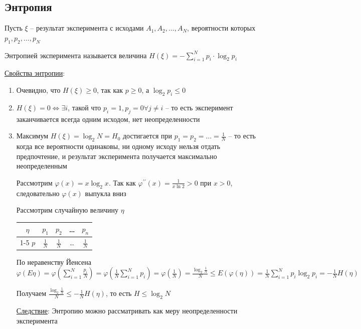 \subsection{Энтропия}

Пусть $\xi$ -- результат эксперимента с исходами $A_1, A_2, \dots, A_N$, вероятности которых $p_1, p_2, \dots, p_N$

\Def Энтропией эксперимента называется величина $H(\xi) = -\sum_{i = 1}^N p_i \cdot \log_2 p_i$

\underline{Свойства энтропии}:

\begin{enumerate}
    \item Очевидно, что $H(\xi) \geq 0$, так как $p \geq 0$, а $\log_2 p_i \leq 0$
    
    \item $H(\xi) = 0 \Longleftrightarrow \exists i$, такой что $p_i = 1, p_j = 0 \forall j \neq i$ -- то есть эксперимент заканчивается всегда одним исходом, нет неопределенности

    \item Максимум $H(\xi) = \log_2 N = H_0$ достигается при $p_1 = p_2 = \dots = \frac{1}{N}$ -- то есть когда все вероятности одинаковы, ни одному исходу нельзя отдать предпочтение, и результат эксперимента получается максимально неопределенным

    \begin{MyProof}
        Рассмотрим $\varphi(x) = x \log_2 x$. Так как $\varphi^{\prime\prime}(x) = \frac{1}{x\ln 2} > 0$ при $x > 0$, следовательно $\varphi(x)$ выпукла вниз

        Рассмотрим случайную величину $\eta$

        \begin{tabular}{c|c|c|c|c}
            $\eta$ & $p_1$ & $p_2$ & \dots & $p_n$ \\
            \cline{1-5}
            $p$   & $\frac{1}{N}$ & $\frac{1}{N}$ & \dots & $\frac{1}{N}$
        \end{tabular}

        По неравенству Йенсена $\varphi(E\eta) = \varphi(\sum_{i = 1}^N \frac{p_i}{N}) = \varphi(\frac{1}{N} \sum_{i = 1}^N p_i) = 
        \varphi(\frac{1}{N}) = \frac{\log_2 \frac{1}{N}}{N} \leq E(\varphi(\eta)) = 
        \frac{1}{N} \sum_{i = 1}^N p_i \log_2 p_i = -\frac{1}{N} H(\eta)$

        Получаем $\frac{\log_2 \frac{1}{N}}{N} \leq -\frac{1}{N} H(\eta)$, то есть $H \leq \log_2 N$
    \end{MyProof}

    \underline{Следствие}: Энтропию можно рассматривать как меру неопределенности эксперимента
\end{enumerate}

